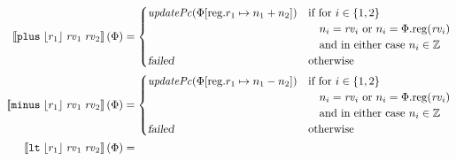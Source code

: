 \documentclass[a4paper]{article}
\newcommand{\update}[2]{[#1 \mapsto #2]}
\newcommand{\sem}[1]{\left\llbracket #1 \right\rrbracket}
\newcommand{\var}[1]{\mathit{#1}}
\newcommand{\rv}{\var{rv}}
\newcommand{\plainproj}[1]{\mathrm{#1}}
\newcommand{\memreg}[1][\Phi]{#1.\plainproj{reg}}
\newcommand{\updateReg}[3][\Phi]{#1\update{\plainproj{reg}.#2}{#3}}
\newcommand{\failed}{\textsl{failed}}
\newcommand{\plainfun}[2]{
  \ifthenelse{\equal{#2}{}}
  {\mathit{#1}}
  {\mathit{#1}(#2)}
}
\newcommand{\stdUpdatePc}[1]{\plainfun{updatePc}{#1}}
\newcommand{\ints}{\mathbb{Z}}
\newcommand{\refreg}[1]{\lfloor #1 \rfloor}
\newcommand{\zinstr}[1]{\mathtt{#1}}
\newcommand{\threeinstr}[4]{\zinstr{#1} \; #2 \; #3 \; #4}
\newcommand{\plus}[3]{\threeinstr{plus}{#1}{#2}{#3}}
\newcommand{\minus}[3]{\threeinstr{minus}{#1}{#2}{#3}}
\newcommand{\lt}[3]{\threeinstr{lt}{#1}{#2}{#3}}
\begin{document}
\begin{align*}
  \sem{\plus{\refreg{r_1}}{\rv_1}{\rv_2}}(\Phi)               & =
                                                          \begin{cases}
                                                            \stdUpdatePc{\updateReg{r_1}{n_1+n_2}} &
                                                            \arraycolsep=0pt
                                                            \begin{array}[t]{l}
                                                              \text{if for $i \in \{1,2\}$}\\
                                                              \quad\text{$n_i = \rv_i$ or $n_i = \memreg(\rv_i)$}\\
                                                              \quad\text{and in either case $n_i \in \ints$}
                                                            \end{array}\\
                                                            \failed & \text{otherwise}
                                                          \end{cases}\\
  \sem{\minus{\refreg{r_1}}{\rv_1}{\rv_2}}(\Phi)               & =
                                                          \begin{cases}
                                                            \stdUpdatePc{\updateReg{r_1}{n_1-n_2}} &
                                                            \arraycolsep=0pt
                                                            \begin{array}[t]{l}
                                                              \text{if for $i \in \{1,2\}$}\\
                                                              \quad\text{$n_i = \rv_i$ or $n_i = \memreg(\rv_i)$}\\
                                                              \quad\text{and in either case $n_i \in \ints$}
                                                            \end{array}\\
                                                            \failed & \text{otherwise}
                                                          \end{cases}\\
  \sem{\lt{\refreg{r_1}}{\rv_1}{\rv_2}}(\Phi)               & =

\end{align*}
\end{document}
